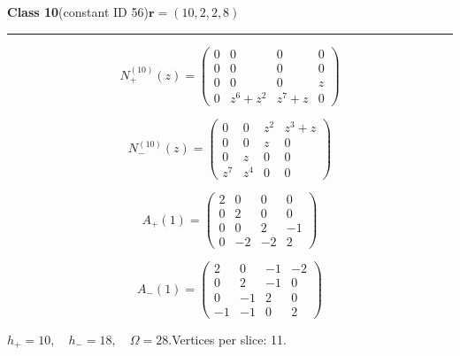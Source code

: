 \noindent\begin{minipage}{\linewidth}
\noindent\textbf{Class 10}\quad\small (constant ID 56)\hfill $\symbf{r}=(10,2,2,8)$
\par\smallskip\noindent\textcolor{rulegray}{\rule{\linewidth}{0.3pt}}
\begin{minipage}[c]{0.495\linewidth}\centering\fontsize{9.7}{12}\selectfont
\setlength{\abovedisplayskip}{4pt}\setlength{\belowdisplayskip}{4pt}
\setlength{\abovedisplayshortskip}{4pt}\setlength{\belowdisplayshortskip}{4pt}
\setlength{\arraycolsep}{3pt}\renewcommand{\arraystretch}{1.08}
\[N_{+}^{(10)}(z)=\begin{pmatrix}0 & 0 & 0 & 0\\0 & 0 & 0 & 0\\0 & 0 & 0 & z\\0 & z^{6} + z^{2} & z^{7} + z & 0\end{pmatrix}\]
\end{minipage}%
\begin{minipage}[c]{0.495\linewidth}\centering\fontsize{9.7}{12}\selectfont
\setlength{\abovedisplayskip}{4pt}\setlength{\belowdisplayskip}{4pt}
\setlength{\abovedisplayshortskip}{4pt}\setlength{\belowdisplayshortskip}{4pt}
\setlength{\arraycolsep}{3pt}\renewcommand{\arraystretch}{1.08}
\[N_{-}^{(10)}(z)=\begin{pmatrix}0 & 0 & z^{2} & z^{3} + z\\0 & 0 & z & 0\\0 & z & 0 & 0\\z^{7} & z^{4} & 0 & 0\end{pmatrix}\]
\end{minipage}%
\par\noindent
\begin{minipage}[c]{0.495\linewidth}\centering\fontsize{9.7}{12}\selectfont
\setlength{\abovedisplayskip}{4pt}\setlength{\belowdisplayskip}{4pt}
\setlength{\abovedisplayshortskip}{4pt}\setlength{\belowdisplayshortskip}{4pt}
\setlength{\arraycolsep}{3pt}\renewcommand{\arraystretch}{1.08}
\[A_{+}(1)=\begin{pmatrix}2 & 0 & 0 & 0\\0 & 2 & 0 & 0\\0 & 0 & 2 & -1\\0 & -2 & -2 & 2\end{pmatrix}\]
\end{minipage}%
\begin{minipage}[c]{0.495\linewidth}\centering\fontsize{9.7}{12}\selectfont
\setlength{\abovedisplayskip}{4pt}\setlength{\belowdisplayskip}{4pt}
\setlength{\abovedisplayshortskip}{4pt}\setlength{\belowdisplayshortskip}{4pt}
\setlength{\arraycolsep}{3pt}\renewcommand{\arraystretch}{1.08}
\[A_{-}(1)=\begin{pmatrix}2 & 0 & -1 & -2\\0 & 2 & -1 & 0\\0 & -1 & 2 & 0\\-1 & -1 & 0 & 2\end{pmatrix}\]
\end{minipage}%
\par\smallskip\noindent\small $h_+=10,\quad h_-=18,\quad \Omega=28.$\quad Vertices per slice: 11.
\end{minipage}\par\vfill
